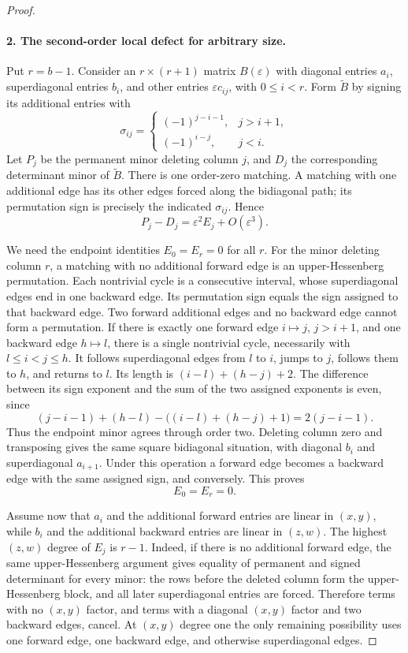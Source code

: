 \begin{proof}
\paragraph{2. The second-order local defect for arbitrary size.}
Put $r=b-1$. Consider an $r\times(r+1)$ matrix $B(\varepsilon)$
with diagonal entries $a_i$, superdiagonal entries $b_i$, and
other entries $\varepsilon c_{ij}$, with $0\leq i<r$.
Form $\widetilde B$ by signing its additional entries with
\[
 \sigma_{ij}=\begin{cases}
 (-1)^{j-i-1},&j>i+1,\\
 (-1)^{i-j},&j<i.
 \end{cases}
\]
Let $P_j$ be the permanent minor deleting column $j$, and $D_j$
the corresponding determinant minor of $\widetilde B$.
There is one order-zero matching. A matching with one additional
edge has its other edges forced along the bidiagonal path; its
permutation sign is precisely the indicated $\sigma_{ij}$.
Hence
\begin{equation}\label{R22:local_defect}
 P_j-D_j=\varepsilon^2E_j+O(\varepsilon^3).
\end{equation}

We need the endpoint identities $E_0=E_r=0$ for all $r$.
For the minor deleting column $r$, a matching with no additional
forward edge is an upper-Hessenberg permutation. Each nontrivial
cycle is a consecutive interval, whose superdiagonal edges end in
one backward edge. Its permutation sign equals the sign assigned
to that backward edge. Two forward additional edges and no backward
edge cannot form a permutation. If there is exactly one forward
edge $i\mapsto j$, $j>i+1$, and one backward edge $h\mapsto l$,
there is a single nontrivial cycle, necessarily with
$l\leq i<j\leq h$. It follows superdiagonal edges from $l$ to $i$,
jumps to $j$, follows them to $h$, and returns to $l$.
Its length is $(i-l)+(h-j)+2$. The difference between its sign
exponent and the sum of the two assigned exponents is even, since
\[
 (j-i-1)+(h-l)-\big((i-l)+(h-j)+1\big)=2(j-i-1).
\]
Thus the endpoint minor agrees through order two.
Deleting column zero and transposing gives the same square
bidiagonal situation, with diagonal $b_i$ and superdiagonal
$a_{i+1}$. Under this operation a forward edge becomes a backward
edge with the same assigned sign, and conversely. This proves
\begin{equation}\label{R22:endpoints}
 E_0=E_r=0.
\end{equation}

Assume now that $a_i$ and the additional forward entries are
linear in $(x,y)$, while $b_i$ and the additional backward entries
are linear in $(z,w)$. The highest $(z,w)$ degree of $E_j$ is
$r-1$. Indeed, if there is no additional forward edge, the same
upper-Hessenberg argument gives equality of permanent and signed
determinant for every minor: the rows before the deleted column
form the upper-Hessenberg block, and all later superdiagonal
entries are forced. Therefore terms with no $(x,y)$ factor, and
terms with a diagonal $(x,y)$ factor and two backward edges, cancel.
At $(x,y)$ degree one the only remaining possibility uses one
forward edge, one backward edge, and otherwise superdiagonal edges.


\end{proof}
